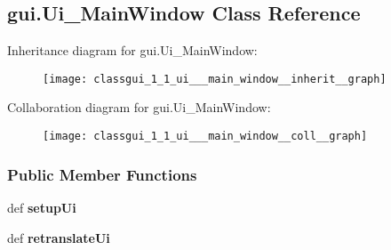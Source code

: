 \hypertarget{classgui_1_1_ui___main_window}{\subsection{gui.\-Ui\-\_\-\-Main\-Window Class Reference}
\label{classgui_1_1_ui___main_window}
}


Inheritance diagram for gui.\-Ui\-\_\-\-Main\-Window\-:\nopagebreak
\begin{figure}[H]
\begin{center}
\leavevmode
\texttt{[image: classgui\_1\_1\_ui\_\_\_main\_window\_\_inherit\_\_graph]}
\end{center}
\end{figure}


Collaboration diagram for gui.\-Ui\-\_\-\-Main\-Window\-:\nopagebreak
\begin{figure}[H]
\begin{center}
\leavevmode
\texttt{[image: classgui\_1\_1\_ui\_\_\_main\_window\_\_coll\_\_graph]}
\end{center}
\end{figure}
\subsubsection*{Public Member Functions}
\begin{DoxyCompactItemize}
\item 
\hypertarget{classgui_1_1_ui___main_window_a9a1bbcec1be5acbadaf4bbe2cb00ac67}{def {\bfseries setup\-Ui}}\label{classgui_1_1_ui___main_window_a9a1bbcec1be5acbadaf4bbe2cb00ac67}

\item 
\hypertarget{classgui_1_1_ui___main_window_acf875fda63898e38deac938fcaac6b89}{def {\bfseries retranslate\-Ui}}\label{classgui_1_1_ui___main_window_acf875fda63898e38deac938fcaac6b89}

\end{DoxyCompactItemize}
